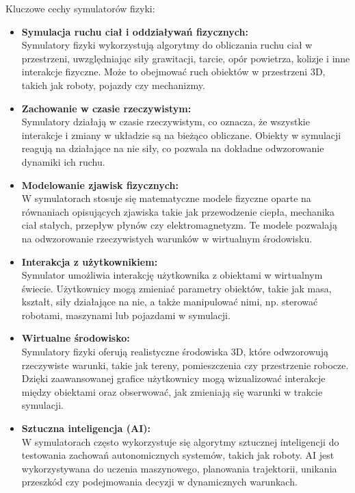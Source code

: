 \documentclass[12pt]{article}
\begin{document}
Kluczowe cechy symulatorów fizyki:
\begin{itemize}
  \item \textbf{Symulacja ruchu ciał i oddziaływań fizycznych:}\\
  Symulatory fizyki wykorzystują algorytmy do obliczania ruchu ciał w przestrzeni, uwzględniając siły grawitacji, tarcie, opór powietrza, kolizje i inne interakcje fizyczne. Może to obejmować ruch obiektów w przestrzeni 3D, takich jak roboty, pojazdy czy mechanizmy.

  \item \textbf{Zachowanie w czasie rzeczywistym:}\\
  Symulatory działają w czasie rzeczywistym, co oznacza, że wszystkie interakcje i zmiany w układzie są na bieżąco obliczane. Obiekty w symulacji reagują na działające na nie siły, co pozwala na dokładne odwzorowanie dynamiki ich ruchu.

  \item \textbf{Modelowanie zjawisk fizycznych:}\\
  W symulatorach stosuje się matematyczne modele fizyczne oparte na równaniach opisujących zjawiska takie jak przewodzenie ciepła, mechanika ciał stałych, przepływ płynów czy elektromagnetyzm. Te modele pozwalają na odwzorowanie rzeczywistych warunków w wirtualnym środowisku.

  \item \textbf{Interakcja z użytkownikiem:}\\
  Symulator umożliwia interakcję użytkownika z obiektami w wirtualnym świecie. Użytkownicy mogą zmieniać parametry obiektów, takie jak masa, kształt, siły działające na nie, a także manipulować nimi, np. sterować robotami, maszynami lub pojazdami w symulacji.

  \item \textbf{Wirtualne środowisko:}\\
  Symulatory fizyki oferują realistyczne środowiska 3D, które odwzorowują rzeczywiste warunki, takie jak tereny, pomieszczenia czy przestrzenie robocze. Dzięki zaawansowanej grafice użytkownicy mogą wizualizować interakcje między obiektami oraz obserwować, jak zmieniają się warunki w trakcie symulacji.

  \item \textbf{Sztuczna inteligencja (AI):}\\
  W symulatorach często wykorzystuje się algorytmy sztucznej inteligencji do testowania zachowań autonomicznych systemów, takich jak roboty. AI jest wykorzystywana do uczenia maszynowego, planowania trajektorii, unikania przeszkód czy podejmowania decyzji w dynamicznych warunkach.


\end{itemize}
\end{document}
